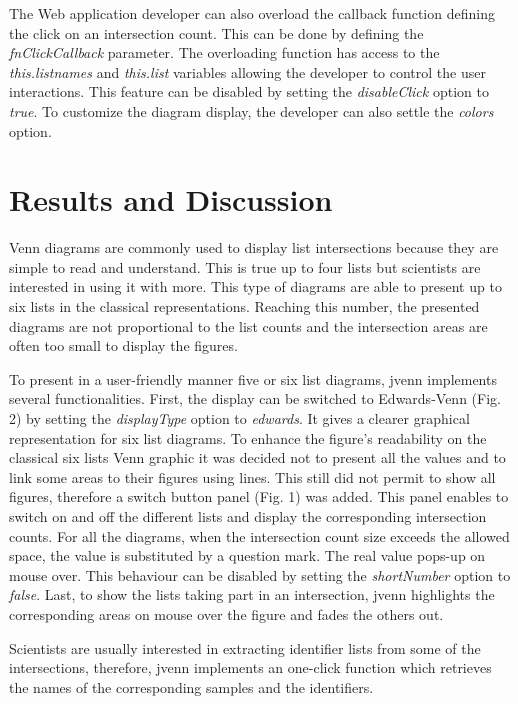 \documentclass{bmcart}
\begin{document}
The Web application developer can also overload the callback function defining the click on an intersection count. This can be done by defining 
the \textit{fnClickCallback} parameter. The overloading function has access to the \textit{this.listnames} and \textit{this.list} variables 
allowing the developer to control the user interactions. This feature can be disabled by setting the \textit{disableClick} option to \textit{true}. 
To customize the diagram display, the developer can also settle the \textit{colors} option.


\section*{Results and Discussion}

Venn diagrams are commonly used to display list intersections because they are simple to read and understand. This is true up to four lists but 
scientists are interested in using it with more. This type of diagrams are able to present up to six lists in the classical representations.
Reaching this number, the presented diagrams are not proportional to the list counts and the intersection areas are often too small to display the 
figures. 

To present in a user-friendly manner five or six list diagrams, jvenn implements several functionalities. First, the display can be switched to
Edwards-Venn (Fig. 2) by setting the \textit{displayType} option to \textit{edwards}. It gives a clearer graphical representation for six list
diagrams. To enhance the figure's readability on the classical six lists Venn graphic it was decided not to present all the values and to link some areas
to their figures using lines. This still did not permit to show all figures, therefore a switch button panel (Fig. 1) was added. This panel enables 
to switch on and off the different lists and display the corresponding intersection counts. For all the diagrams, when the intersection count size 
exceeds the allowed space, the value is substituted by a question mark. The real value pops-up on mouse over. This behaviour can be disabled by setting 
the \textit{shortNumber} option to \textit{false}. Last, to show the lists taking part in an intersection, jvenn highlights the corresponding areas on
mouse over the figure and fades the others out.

Scientists are usually interested in extracting identifier lists from some of the intersections, therefore, jvenn implements an one-click function which 
retrieves the names of the corresponding samples and the identifiers.
\end{document}
